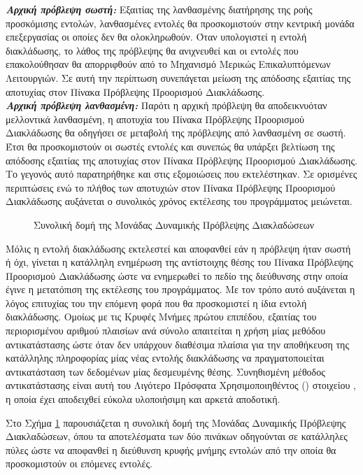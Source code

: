 \indent\textit{\textbf{Αρχική πρόβλεψη σωστή:}} Εξαιτίας της λανθασμένης διατήρησης της ροής προσκόμισης εντολών, λανθασμένες εντολές θα προσκομιστούν στην κεντρική μονάδα επεξεργασίας οι οποίες δεν θα ολοκληρωθούν. Όταν υπολογιστεί η εντολή διακλάδωσης, το λάθος της πρόβλεψης θα ανιχνευθεί και οι εντολές που επακολούθησαν θα απορριφθούν από το Μηχανισμό Μερικώς Επικαλυπτόμενων Λειτουργιών. Σε αυτή την περίπτωση συνεπάγεται μείωση της απόδοσης εξαιτίας της αποτυχίας στον Πίνακα Πρόβλεψης Προορισμού Διακλάδωσης.\\
\indent\textit{\textbf{Αρχική πρόβλεψη λανθασμένη:}} Παρότι η αρχική πρόβλεψη θα αποδεικνυόταν μελλοντικά λανθασμένη, η αποτυχία του Πίνακα Πρόβλεψης Προορισμού Διακλάδωσης θα οδηγήσει σε μεταβολή της πρόβλεψης από λανθασμένη σε σωστή. Έτσι θα προσκομιστούν οι σωστές εντολές και συνεπώς θα υπάρξει βελτίωση της απόδοσης εξαιτίας της αποτυχίας στον Πίνακα Πρόβλεψης Προορισμού Διακλάδωσης. Το γεγονός αυτό παρατηρήθηκε και στις εξομοιώσεις που εκτελέστηκαν. Σε ορισμένες περιπτώσεις ενώ το πλήθος των αποτυχιών στον Πίνακα Πρόβλεψης Προορισμού Διακλάδωσης αυξάνεται ο συνολικός χρόνος εκτέλεσης του προγράμματος μειώνεται.

\begin{figure}[t]
    \centering
    \caption{Συνολική δομή της Μονάδας Δυναμικής Πρόβλεψης Διακλαδώσεων}
    \label{fig:chap2_dynamic_predictor}
\end{figure}

Μόλις η εντολή διακλάδωσης εκτελεστεί και αποφανθεί εάν η πρόβλεψη ήταν σωστή ή όχι, γίνεται η κατάλληλη ενημέρωση της αντίστοιχης θέσης του Πίνακα Πρόβλεψης Προορισμού Διακλάδωσης ώστε να ενημερωθεί το πεδίο της διεύθυνσης στην οποία έγινε η μετατόπιση της εκτέλεσης του προγράμματος. Με τον τρόπο αυτό αυξάνεται η λόγος επιτυχίας του την επόμενη φορά που θα προσκομιστεί η ίδια εντολή διακλάδωσης. Ομοίως με τις Κρυφές Μνήμες πρώτου επιπέδου, εξαιτίας του περιορισμένου αριθμού πλαισίων ανά σύνολο απαιτείται η χρήση μίας μεθόδου αντικατάστασης ώστε όταν δεν υπάρχουν διαθέσιμα πλαίσια για την αποθήκευση της κατάλληλης πληροφορίας μίας νέας εντολής διακλάδωσης να πραγματοποιείται αντικατάσταση των δεδομένων μίας δεσμευμένης θέσης. Συνηθισμένη μέθοδος αντικατάστασης είναι αυτή του Λιγότερο Πρόσφατα Χρησιμοποιηθέντος () στοιχείου \cite{sudarshan2004highly, al2004performance}, η οποία έχει αποδειχθεί εύκολα υλοποιήσιμη και αρκετά αποδοτική.
\par
Στο Σχήμα \ref{fig:chap2_dynamic_predictor} παρουσιάζεται η συνολική δομή της Μονάδας Δυναμικής Πρόβλεψης Διακλαδώσεων, όπου τα αποτελέσματα των δύο πινάκων οδηγούνται σε κατάλληλες πύλες ώστε να αποφανθεί η διεύθυνση κρυφής μνήμης εντολών από την οποία θα προσκομιστούν οι επόμενες εντολές.

